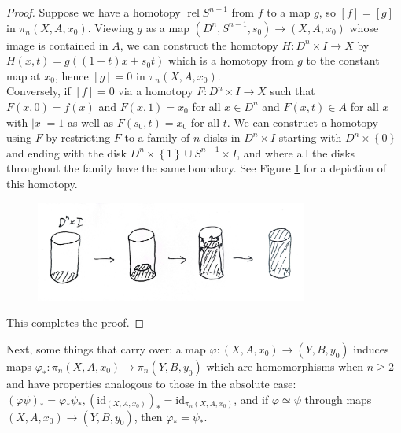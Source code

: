 \documentclass[reqno]{amsart}
\theoremstyle{definition}
\theoremstyle{remark}
\DeclareMathOperator{\rel}{rel}
\newcommand{\id}{{\mathrm{id}}}
\begin{document}
  \begin{proof}
      Suppose we have a homotopy
      $\rel S^{n-1}$ from $f$ to a map
      $g$, so
      $\left[ f \right] = \left[ g \right] $ in
      $\pi_n \left( X, A, x_0 \right) $. 
      Viewing $g$ as a map
      $\left( D^{n}, S^{n-1}, s_0 \right) 
      \to \left( X, A, x_0 \right) $ whose
      image is contained in $A$, we
      can construct the homotopy
      $H \colon D^{n} \times I \to X$ by
      $H(x,t) = g\left( (1-t) x + s_0 t \right) $ 
      which is a homotopy from $g$ to the
      constant map at $x_0$, hence
      $\left[ g \right]  = 0$ in $\pi_n (X, A, x_0)$.\\
      Conversely, if $\left[ f \right] = 0$ via
      a homotopy $F \colon D^{n} \times I \to X$ such that
      $F(x,0) = f(x)$ and
      $F(x,1) = x_0$ for all $x \in D^{n}$ and
      $F(x,t) \in A$ for all
      $x$ with $\left| x \right| = 1$ as well
      as $F(s_0,t) = x_0$ for all $t$. We can
      construct a homotopy
      using $F$ by restricting $F$ to a family of
      $n$-disks in $D^{n} \times I$ starting with
      $D^{n}\times \left\{ 0 \right\} $ and ending
      with the disk $D^{n} \times \left\{ 1 \right\} 
      \cup S^{n-1} \times I$, and where all the disks
      throughout the family have the same boundary.
      See Figure \ref{fig:DJIMMXKXO0O-jpeg} for a depiction
      of this homotopy.

      \begin{figure}[htpb]
          \centering
          \includegraphics[width=0.8\textwidth]{DJIMMXKXO0O.jpeg}
          \caption{}
          \label{fig:DJIMMXKXO0O-jpeg}
      \end{figure}
      This completes the proof.
  \end{proof}

  Next, some things that carry over:
  a map $\varphi \colon \left( X, A, x_0 \right) 
  \to \left( Y, B, y_0 \right) $ induces maps
  $\varphi_* \colon \pi_n \left( X, A, x_0 \right) 
  \to \pi_n \left( Y, B, y_0 \right) $ which are
  homomorphisms when $n\ge 2$ and have properties analogous
  to those in the absolute case: 
  $\left( \varphi \psi  \right)_* = 
  \varphi_* \psi_*, (\id_{(X,A,x_0)})_{*} = \id_{\pi_n (X, A, x_0)}$,
  and if  $\varphi \simeq \psi $ through maps
  $\left( X,A,x_0 \right) \to \left( Y,B,y_0 \right) $,
  then $\varphi_* = \psi_*$. 
\end{document}
